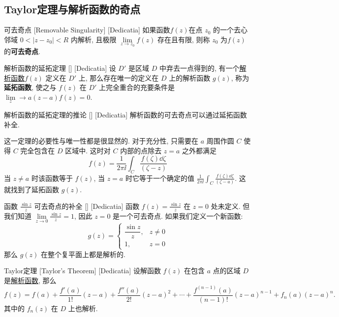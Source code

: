 \documentclass[UTF8]{ctexart}
\newcommand{\AnalyticalFunction}{\hyperref[dfn:AnalyticalFunction]{解析函数}}
\begin{document}
\subsection{Taylor定理与解析函数的奇点}
\begin{dfn}
    [RemovableSingularity]
    {可去奇点}
    [Removable Singularity]
    [Dedicatia]
    如果函数\( f(z) \)在点 \( z_0 \) 的一个去心邻域 \( 0 < |z - z_0| < R \) 内解析, 且极限 \( \lim\limits_{z \to z_0} f(z) \) 存在且有限, 则称 \( z_0 \) 为\( f(z) \)的\textbf{可去奇点}. 
\end{dfn}
\begin{thm}
    [UUID]
    {解析函数的延拓定理}
    []
    [Dedicatia]
    设 \( D' \) 是区域 \( D \) 中弃去一点得到的, 有一个\AnalyticalFunction  \( f(z) \) 定义在 \( D' \) 上, 那么存在唯一的定义在 \( D \) 上的解析函数 \( g(z) \), 称为\textbf{延拓函数}, 使之与 \( f(z) \) 在 \( D' \) 上完全重合的充要条件是 \( \lim\limits_z\to a(z-a)f(z)=0 \).
\end{thm}
\begin{crl}
    [UUID]
    {解析函数的延拓定理的推论}
    []
    [Dedicatia]
    解析函数的可去奇点可以通过延拓函数补全. 
\end{crl}
\begin{prf}
    这一定理的必要性与唯一性都是很显然的. 对于充分性, 只需要在 \( a \) 周围作圆 \( C \) 使得 \( C \) 完全包含在 \( D \) 区域中. 这时对 \( C \) 内部的点除去 \( z=a \) 之外都满足
    \[f(z)=\frac{1}{2\pi\ii}\int_C \frac{f(\zeta)\dd{\zeta}}{(\zeta-z)}\]
    当 \( z\neq a \) 时该函数等于 \( f(z) \), 当 \( z=a \) 时它等于一个确定的值 \( \frac{1}{2\pi\ii}\int_C \frac{f(\zeta)\dd{\zeta}}{(\zeta-a)} \). 这就找到了延拓函数 \( g(z) \).
\end{prf}
\begin{xmp}
    [UUID]
    {函数 \( \frac{\sin z}{z} \) 可去奇点的补全}
    []
    [Dedicatia]
    函数 \( f(z) = \frac{\sin z}{z} \) 在 \( z = 0 \) 处未定义. 但我们知道 \( \lim\limits_{z \to 0} \frac{\sin z}{z} = 1 \), 因此 \( z=0 \) 是一个可去奇点. 如果我们定义一个新函数: 
    \[
    g(z) = \begin{cases}
    \dfrac{\sin z}{z}, & z \neq 0 \\
    1, & z = 0
    \end{cases}
    \]
    那么 \( g(z) \) 在整个复平面上都是解析的. 
\end{xmp}
\begin{thm}
    [Taylor]
    {Taylor定理\label{thm:Taylor}}
    [Taylor's Theorem]
    [Dedicatia]
    设解函数 \( f(z) \) 在包含 \( a \) 点的区域 \( D \) 是\AnalyticalFunction, 那么
    \[f(z)=f(a)+\frac{f'(a)}{1!}(z-a)+\frac{f''(a)}{2!}(z-a)^2+\cdots+\frac{f^{(n-1)}(a)}{(n-1)!}(z-a)^{n-1}+f_n(a)(z-a)^n.\]
    其中的 \( f_n(z) \) 在 \( D \) 上也解析. 
\end{thm}
\end{document}
